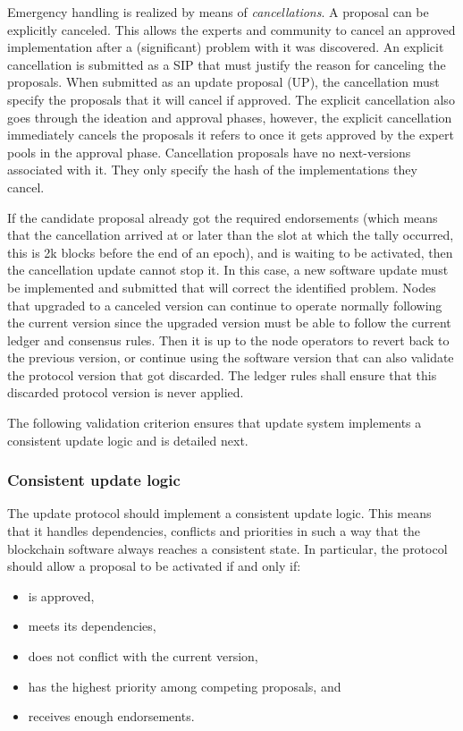 Emergency handling is realized by means of \emph{cancellations}. A
proposal can be explicitly canceled. This allows the experts and community to
cancel an approved implementation after a (significant) problem with it was
discovered. An explicit cancellation is submitted as a SIP that must justify
the reason for canceling the proposals. When submitted as an update proposal
(UP), the cancellation must specify the proposals that it will cancel if
approved. The explicit cancellation also goes through the ideation and approval
phases, however, the explicit cancellation immediately cancels the proposals it
refers to once it gets approved by the expert pools in the approval phase.
Cancellation proposals have no next-versions associated with it. They only
specify the hash of the implementations they cancel.

If the candidate proposal already got the required endorsements (which means 
that the
cancellation arrived at or later than the slot at which the tally occurred, 
this is 2k blocks before
the end of an epoch), and is waiting to be activated, then the cancellation 
update cannot stop it. In this case, a new software update must be implemented 
and submitted that will correct the identified problem. Nodes that upgraded to 
a canceled version can continue to operate normally following
the current version since the upgraded version must be able to follow the 
current ledger and
consensus rules. Then it is up to the node operators to revert back to the 
previous version, or
continue using the software version that can also validate the protocol version 
that got discarded.
The ledger rules shall ensure that this discarded protocol version is never 
applied.


The following validation criterion ensures that update system implements a
consistent update logic and is detailed next.

\subsubsection{Consistent update logic}\label{vc:consistent_update_logic}
The update protocol should implement a consistent update logic. This means that
it handles dependencies, conflicts and priorities in such a way that the
blockchain software always reaches a consistent state. In particular, the
protocol should allow a proposal to be activated if and
only if:
\begin{itemize}
	\item is approved,
	\item meets its dependencies,
	\item does not conflict with the current version,
	\item has the highest priority among competing proposals, and
	\item receives enough endorsements.
\end{itemize}

